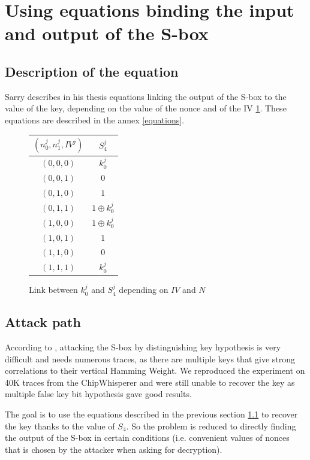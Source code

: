 \documentclass[a4paper,11pt,twocolumn]{article}
\begin{document}
	\section{Using equations binding the input and output of the S-box}
	\subsection{Description of the equation} \label{sec_equ}
	Sarry \cite{these} describes in his thesis equations linking the output of the S-box to the value of the key, depending on the value of the nonce and of the IV \ref{link_k_s4}. These equations are described in the annex \ref{equations}.
	
	\begin{figure}[h]
		\centering
		\begin{tabular}{|c|c|}
			\hline
			$(n_0^j,n_1^j,IV^j)$&$S_4^j$\\
			\hline\hline
			$(0,0,0)$&$k_0^j$\\
			\hline
			$(0,0,1)$&$0$\\
			\hline
			$(0,1,0)$&$1$\\
			\hline
			$(0,1,1)$&$1 \oplus k_0^j$\\
			\hline
			$(1,0,0)$&$1 \oplus k_0^j$\\
			\hline
			$(1,0,1)$&$1$\\
			\hline
			$(1,1,0)$&$0$\\
			\hline
			$(1,1,1)$&$k_0^j$\\
			\hline
		\end{tabular}
		\caption{Link between $k_0^j$ and $S_4^j$ depending on $IV$ and $N$}
		\label{link_k_s4}
	\end{figure}
	
	\subsection{Attack path}
	According to \cite{cpa_analysis}, attacking the S-box by distinguishing key hypothesis is very difficult and needs numerous traces, as there are multiple keys that give strong correlations to their vertical Hamming Weight. We reproduced the experiment on 40K traces from the ChipWhisperer and were still unable to recover the key as multiple false key bit hypothesis gave good results.
	
	The goal is to use the equations described in the previous section \ref{sec_equ} to recover the key thanks to the value of $S_4$. So the problem is reduced to directly finding the output of the S-box in certain conditions (i.e. convenient values of nonces that is chosen by the attacker when asking for decryption). 
	
\end{document}
